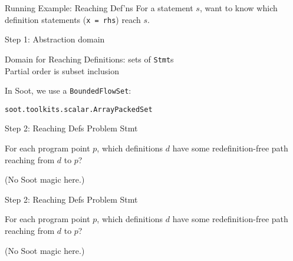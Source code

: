 
\begin{slide}{Running Example: Reaching Def'ns}
\vspace*{-0.2in}
For a statement $s$, want to know which definition statements ({\tt x = rhs})
{\green reach} $s$.
\begin{center}

\end{center}
\end{slide}


\begin{slide}{Step 1: Abstraction domain}
\vspace*{-0.2in}

Domain for Reaching Definitions: sets of {\tt Stmt}s\\
Partial order is subset inclusion

\begin{center}
\scalebox{0.95}{
}
\mbox{\qquad }
\end{center}
\vspace*{-0.1in}

In Soot, we use a {\tt BoundedFlowSet}:
\begin{center}
{\tt soot.toolkits.scalar.ArrayPackedSet} 
\end{center}
\end{slide}




\begin{slide}{Step 2: Reaching Defs Problem Stmt}

For each program point $p$, which definitions $d$ have some
redefinition-free path reaching from $d$ to $p$?

\begin{center}

\end{center}

(No Soot magic here.)

\end{slide}


\begin{slide}{Step 2: Reaching Defs Problem Stmt}

For each program point $p$, which definitions $d$ have some
redefinition-free path reaching from $d$ to $p$?

\begin{center}

\end{center}

(No Soot magic here.)

\end{slide}

